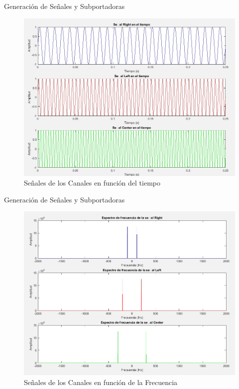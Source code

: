 \documentclass[mathserif,spanish]{beamer}
\begin{document}
\begin{frame}{Generación de Señales y Subportadoras}
    \begin{figure}[h]
        \centering
        \includegraphics[scale=0.2]{d_tie_CHs.png}
      
        \caption{Señales de los Canales en función del tiempo}
    \end{figure}
\end{frame}

\begin{frame}{Generación de Señales y Subportadoras}
    \begin{figure}[h]
        \centering
        \includegraphics[scale=0.2]{d_fre_CHs.png}
      
        \caption{Señales de los Canales en función de la Frecuencia}
    \end{figure}
\end{frame}
\end{document}
